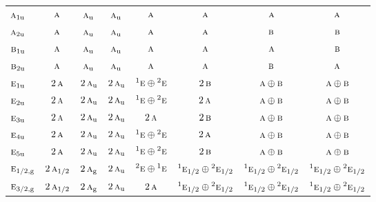\documentclass[10pt,a4paper]{article}
\numberwithin{equation}{section}
\newcommand{\irr}[1]{\text{\normalfont\scshape #1}}
\newcommand{\conjpair}[1]{{}^{#1}}
\newcommand{\ptag}[1]{\mathrm{#1}}
\begin{document}
{\begin{longtable}{@{}lccccccc@{}}
$\irr{a}_{1\ptag{u}}$ & $\irr{a}$ & $\irr{a}_{\ptag{u}}$ & $\irr{a}_{\ptag{u}}$ & $\irr{a}$ & $\irr{a}$ & $\irr{a}$ & $\irr{a}$\\
$\irr{a}_{2\ptag{u}}$ & $\irr{a}$ & $\irr{a}_{\ptag{u}}$ & $\irr{a}_{\ptag{u}}$ & $\irr{a}$ & $\irr{a}$ & $\irr{b}$ & $\irr{b}$\\
$\irr{b}_{1\ptag{u}}$ & $\irr{a}$ & $\irr{a}_{\ptag{u}}$ & $\irr{a}_{\ptag{u}}$ & $\irr{a}$ & $\irr{a}$ & $\irr{a}$ & $\irr{b}$\\
$\irr{b}_{2\ptag{u}}$ & $\irr{a}$ & $\irr{a}_{\ptag{u}}$ & $\irr{a}_{\ptag{u}}$ & $\irr{a}$ & $\irr{a}$ & $\irr{b}$ & $\irr{a}$\\
$\irr{e}_{1\ptag{u}}$ & $2\,\irr{a}$ & $2\,\irr{a}_{\ptag{u}}$ & $2\,\irr{a}_{\ptag{u}}$ & $\conjpair{1}\irr{e}\oplus \conjpair{2}\irr{e}$ & $2\,\irr{b}$ & $\irr{a}\oplus \irr{b}$ & $\irr{a}\oplus \irr{b}$\\
$\irr{e}_{2\ptag{u}}$ & $2\,\irr{a}$ & $2\,\irr{a}_{\ptag{u}}$ & $2\,\irr{a}_{\ptag{u}}$ & $\conjpair{1}\irr{e}\oplus \conjpair{2}\irr{e}$ & $2\,\irr{a}$ & $\irr{a}\oplus \irr{b}$ & $\irr{a}\oplus \irr{b}$\\
$\irr{e}_{3\ptag{u}}$ & $2\,\irr{a}$ & $2\,\irr{a}_{\ptag{u}}$ & $2\,\irr{a}_{\ptag{u}}$ & $2\,\irr{a}$ & $2\,\irr{b}$ & $\irr{a}\oplus \irr{b}$ & $\irr{a}\oplus \irr{b}$\\
$\irr{e}_{4\ptag{u}}$ & $2\,\irr{a}$ & $2\,\irr{a}_{\ptag{u}}$ & $2\,\irr{a}_{\ptag{u}}$ & $\conjpair{1}\irr{e}\oplus \conjpair{2}\irr{e}$ & $2\,\irr{a}$ & $\irr{a}\oplus \irr{b}$ & $\irr{a}\oplus \irr{b}$\\
$\irr{e}_{5\ptag{u}}$ & $2\,\irr{a}$ & $2\,\irr{a}_{\ptag{u}}$ & $2\,\irr{a}_{\ptag{u}}$ & $\conjpair{1}\irr{e}\oplus \conjpair{2}\irr{e}$ & $2\,\irr{b}$ & $\irr{a}\oplus \irr{b}$ & $\irr{a}\oplus \irr{b}$\\
$\irr{e}_{1/2,\ptag{g}}$ & $2\,\irr{a}_{1/2}$ & $2\,\irr{a}_{\ptag{g}}$ & $2\,\irr{a}_{\ptag{u}}$ & $\conjpair{2}\irr{e}\oplus \conjpair{1}\irr{e}$ & $\conjpair{1}\irr{e}_{1/2}\oplus \conjpair{2}\irr{e}_{1/2}$ & $\conjpair{1}\irr{e}_{1/2}\oplus \conjpair{2}\irr{e}_{1/2}$ & $\conjpair{1}\irr{e}_{1/2}\oplus \conjpair{2}\irr{e}_{1/2}$\\
$\irr{e}_{3/2,\ptag{g}}$ & $2\,\irr{a}_{1/2}$ & $2\,\irr{a}_{\ptag{g}}$ & $2\,\irr{a}_{\ptag{u}}$ & $2\,\irr{a}$ & $\conjpair{1}\irr{e}_{1/2}\oplus \conjpair{2}\irr{e}_{1/2}$ & $\conjpair{1}\irr{e}_{1/2}\oplus \conjpair{2}\irr{e}_{1/2}$ & $\conjpair{1}\irr{e}_{1/2}\oplus \conjpair{2}\irr{e}_{1/2}$\\

\end{longtable}}
\end{document}
